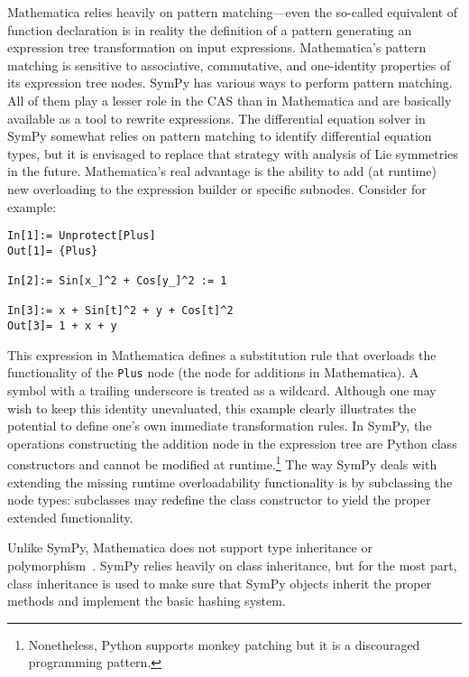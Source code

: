 


Mathematica relies heavily on pattern matching---even the so-called equivalent of function declaration is in reality
the definition of a pattern generating an expression tree transformation
on input expressions.
%
Mathematica's pattern matching is sensitive to
associative, commutative, and
one-identity properties of its expression tree
nodes.
%
SymPy has various ways to perform pattern matching.
All of them play a lesser role in the CAS than in Mathematica
and are basically available as a tool to rewrite expressions.
The differential equation solver in SymPy somewhat relies on pattern matching to
identify differential equation types, but it is envisaged to replace
that strategy with analysis of Lie symmetries in the future.
Mathematica's real advantage is the ability to add (at runtime) new overloading
to the expression builder or specific subnodes.
Consider for example:
\begin{verbatim}
In[1]:= Unprotect[Plus]
Out[1]= {Plus}

In[2]:= Sin[x_]^2 + Cos[y_]^2 := 1

In[3]:= x + Sin[t]^2 + y + Cos[t]^2
Out[3]= 1 + x + y
\end{verbatim}
This expression in Mathematica defines a substitution rule that overloads
the functionality of the \texttt{Plus} node (the node for additions in Mathematica).
A symbol with a trailing underscore is treated as a wildcard.
Although one may wish to keep this identity unevaluated, this example clearly
illustrates the potential to define
one's own immediate transformation rules.
In SymPy, the operations constructing the addition node in the expression tree
are Python class constructors
and cannot be modified at runtime.\footnote{Nonetheless, Python supports monkey
patching but it is a discouraged programming pattern.}
The way SymPy deals with extending the missing runtime overloadability functionality
is by subclassing the node types: subclasses may redefine the class constructor
to yield the proper extended functionality.




Unlike SymPy, Mathematica does not support type inheritance or poly\-morph\-ism~\cite{Fateman1992}.
%
SymPy relies heavily on class inheritance, but for the most part,
class inheritance is used to make sure that SymPy objects inherit the proper
methods and implement the basic hashing system.

